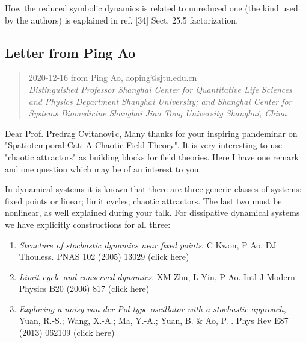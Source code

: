 {{How the reduced symbolic dynamics is related to unreduced one (the kind
used by the  authors) is explained in ref. [34]
        {Sect. 25.5  factorization}.

\newpage
\subsection{Letter from Ping Ao}
\label{sect:Pin Ao21}
\begin{quote}
2020-12-16
from
{Ping Ao}, aoping@sjtu.edu.cn
\\
\emph{Distinguished Professor Shanghai Center for Quantitative
Life Sciences and Physics Department  Shanghai University; and  Shanghai
Center for Systems Biomedicine  Shanghai Jiao Tong University Shanghai,
China}
\end{quote}

Dear Prof. Predrag Cvitanovi\,c,
Many thanks for your inspiring pandeminar on "Spatiotemporal Cat: A
Chaotic Field Theory". It is very interesting to use "chaotic attractors"
as building blocks for field theories. Here I have one remark and one
question which may be of an interest to you.

In dynamical systems it is known that there are three generic classes of systems:
 fixed points or linear; limit cycles; chaotic attractors.
The last two must be nonlinear, as well explained during your talk.
For dissipative dynamical systems we have explicitly constructions for all three:

\begin{enumerate}
  \item \emph{Structure of stochastic dynamics near fixed points},
   C Kwon, P Ao, DJ Thouless. PNAS 102 (2005) 13029
{(click here)}

  \item \emph{Limit cycle and conserved dynamics},
   XM Zhu, L Yin, P Ao. Intl J Modern Physics B20 (2006) 817
{(click here)}

  \item
\emph{Exploring a noisy van der Pol type oscillator with a stochastic approach},
   Yuan, R.-S.; Wang, X.-A.; Ma, Y.-A.; Yuan, B. \& Ao, P. . Phys Rev E87
   (2013) 062109
{(click here)}


\end{enumerate}}}
